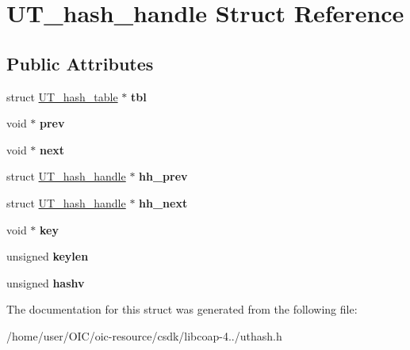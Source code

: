 \hypertarget{structUT__hash__handle}{}\section{U\+T\+\_\+hash\+\_\+handle Struct Reference}
\label{structUT__hash__handle}
\subsection*{Public Attributes}
\begin{DoxyCompactItemize}
\item 
\hypertarget{structUT__hash__handle_ad2035ee3b2aa55b22e352341372a5e73}{}struct \hyperlink{structUT__hash__table}{U\+T\+\_\+hash\+\_\+table} $\ast$ {\bfseries tbl}\label{structUT__hash__handle_ad2035ee3b2aa55b22e352341372a5e73}

\item 
\hypertarget{structUT__hash__handle_abaf54a69367933df2d45575f48ca6a58}{}void $\ast$ {\bfseries prev}\label{structUT__hash__handle_abaf54a69367933df2d45575f48ca6a58}

\item 
\hypertarget{structUT__hash__handle_a93bc88ffe97f85ea0d9e0056b7118942}{}void $\ast$ {\bfseries next}\label{structUT__hash__handle_a93bc88ffe97f85ea0d9e0056b7118942}

\item 
\hypertarget{structUT__hash__handle_a3ec03e34d7975d5c1981c44b324619b2}{}struct \hyperlink{structUT__hash__handle}{U\+T\+\_\+hash\+\_\+handle} $\ast$ {\bfseries hh\+\_\+prev}\label{structUT__hash__handle_a3ec03e34d7975d5c1981c44b324619b2}

\item 
\hypertarget{structUT__hash__handle_a4f6989385499ba6f594b0f0facd28325}{}struct \hyperlink{structUT__hash__handle}{U\+T\+\_\+hash\+\_\+handle} $\ast$ {\bfseries hh\+\_\+next}\label{structUT__hash__handle_a4f6989385499ba6f594b0f0facd28325}

\item 
\hypertarget{structUT__hash__handle_a40690fc15aeaeba8f25385f05f84dd4d}{}void $\ast$ {\bfseries key}\label{structUT__hash__handle_a40690fc15aeaeba8f25385f05f84dd4d}

\item 
\hypertarget{structUT__hash__handle_af2abdc405972a6bbdee2ade2c0f346c4}{}unsigned {\bfseries keylen}\label{structUT__hash__handle_af2abdc405972a6bbdee2ade2c0f346c4}

\item 
\hypertarget{structUT__hash__handle_aae5e635fa110556e5007f627089f8323}{}unsigned {\bfseries hashv}\label{structUT__hash__handle_aae5e635fa110556e5007f627089f8323}

\end{DoxyCompactItemize}


The documentation for this struct was generated from the following file\+:\begin{DoxyCompactItemize}
\item 
/home/user/\+O\+I\+C/oic-\/resource/csdk/libcoap-\/4../uthash.\+h\end{DoxyCompactItemize}
